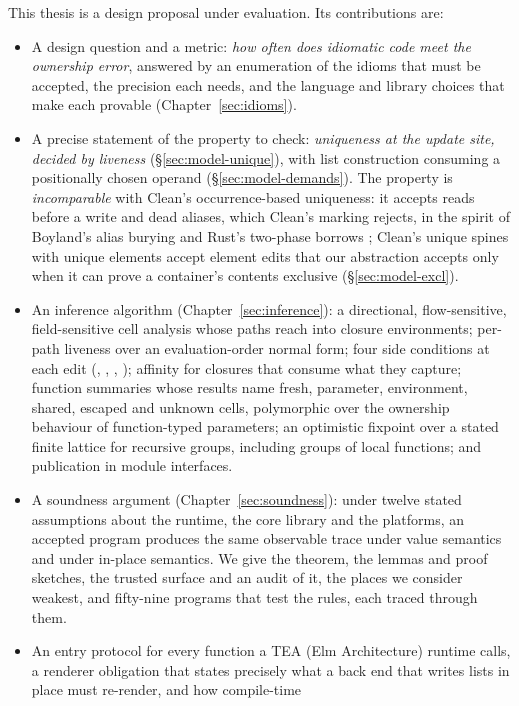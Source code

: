 This thesis is a design proposal under evaluation. Its contributions are:
\begin{itemize}
\item A design question and a metric: \emph{how often does idiomatic code meet the ownership error},
answered by an enumeration of the idioms that must be accepted, the precision each needs, and the
language and library choices that make each provable (Chapter~\ref{sec:idioms}).
\item A precise statement of the property to check: \emph{uniqueness at the update site, decided by
liveness} (\S\ref{sec:model-unique}), with list construction consuming a positionally chosen operand
(\S\ref{sec:model-demands}). The property is \emph{incomparable} with Clean's occurrence-based
uniqueness: it accepts reads before a write and dead aliases, which Clean's marking rejects, in the
spirit of Boyland's alias burying \citep{boyland2001alias} and Rust's two-phase borrows
\citep{rfc2025}; Clean's unique spines with unique elements accept element edits that our abstraction
accepts only when it can prove a container's contents exclusive (\S\ref{sec:model-excl}).
\item An inference algorithm (Chapter~\ref{sec:inference}): a directional, flow-sensitive,
field-sensitive cell analysis whose paths reach into closure environments; per-path liveness over an
evaluation-order normal form; four side conditions at each edit (\Known, \Unescaped, \Dead,
\Disjoint); affinity for closures that consume what they capture; function summaries whose results
name fresh, parameter, environment, shared, escaped and unknown cells, polymorphic over the ownership
behaviour of function-typed parameters; an optimistic fixpoint over a stated finite lattice for
recursive groups, including groups of local functions; and publication in module interfaces.
\item A soundness argument (Chapter~\ref{sec:soundness}): under twelve stated assumptions about the
runtime, the core library and the platforms, an accepted program produces the same observable trace
under value semantics and under in-place semantics. We give the theorem, the lemmas and proof
sketches, the trusted surface and an audit of it, the places we consider weakest, and fifty-nine programs that test the
rules, each traced through them.
\item An entry protocol for every function a TEA (Elm Architecture) runtime calls, a renderer obligation
that states precisely what a back end that writes lists in place must re-render, and how compile-time

\end{itemize}
